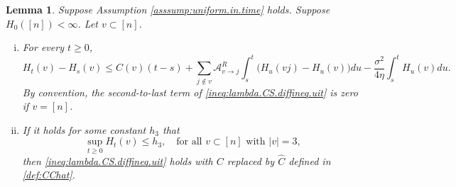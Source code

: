 \documentclass[11pt,reqno]{amsart}
\numberwithin{equation}{section}
\newtheorem{lemma}[theorem]{Lemma}
\theoremstyle{definition}
\def\CC{{C}}
\def\A{{\mathcal A}}
\begin{document}
		\begin{lemma}\label{lem: init.ent.est-unif}
	Suppose Assumption \ref{asssump:uniform.in.time} holds. Suppose $H_0([n]) < \infty$.
Let $v \subset [n]$. 
	\begin{enumerate}[(i)]
	\item For every $t \ge 0$,
	\begin{equation} \label{ineq:lambda.CS.diffineq.uit}
		H_t(v) - H_s(v) \le C(v)(t - s) + \sum_{j \notin v} \A^{R}_{v \to j} \int_s^t \Big(H_u(vj) - H_u(v)\Big) du- \frac{\sigma^2}{4 \eta} \int_s^t H_u(v) du.
	\end{equation}
	By convention, the second-to-last term of \eqref{ineq:lambda.CS.diffineq.uit} is zero if $v=[n]$. 
	\item If it holds for some constant $h_3$ that 
	\begin{equation}
		 \sup_{t \ge 0}H_{t}(v) \le h_3, \quad \text{for all } v\subset [n] \text{ with } |v|=3, \label{asmp:k=3.uit}
		\end{equation}
		 then \eqref{ineq:lambda.CS.diffineq.uit} holds with $\CC$ replaced by $\widehat{\CC}$ defined in \eqref{def:CChat}.
	\end{enumerate}
	\end{lemma}
\end{document}
